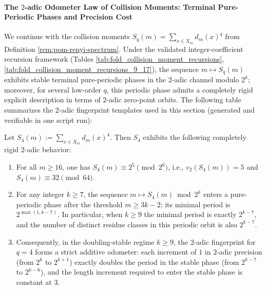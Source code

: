 
\paragraph{The \(2\)-adic Odometer Law of Collision Moments: Terminal Pure-Periodic Phases and Precision Cost}\label{subsubsec:pom-collision-moment-2adic-odometer}
We continue with the collision moments \(S_q(m)=\sum_{x\in X_m}d_m(x)^q\) from Definition \ref{rem:pom-renyi-spectrum}.
Under the validated integer-coefficient recursion framework (Tables \ref{tab:fold_collision_moment_recursions}, \ref{tab:fold_collision_moment_recursions_9_17}),
the sequence \(m\mapsto S_q(m)\) exhibits stable terminal pure-periodic phases in the \(2\)-adic channel modulo \(2^k\);
moreover, for several low-order \(q\), this periodic phase admits a completely rigid explicit description in terms of \(2\)-adic zero-point orbits.
The following table summarizes the \(2\)-adic fingerprint templates used in this section (generated and verifiable in one script run):

\begin{conclusion}[The \(2\)-adic Odometer Law for \texorpdfstring{$q=4$}{q=4}: From Constant Modulo \texorpdfstring{$2^6$}{64} to Exact Doubling Periods]\label{con:pom-s4-2adic-odometer}
Let \(S_4(m):=\sum_{x\in X_m} d_m(x)^4\).
Then \(S_4\) exhibits the following completely rigid \(2\)-adic behavior:
\begin{enumerate}
  \item For all \(m\ge 16\), one has \(S_4(m)\equiv 2^5\pmod{2^6}\), i.e., \(v_2(S_4(m))=5\) and \(S_4(m)\equiv 32\pmod{64}\).
  \item For any integer \(k\ge 7\), the sequence \(m\mapsto S_4(m)\bmod 2^k\) enters a pure-periodic phase after the threshold \(m\ge 3k-2\); its minimal period is \(2^{\max(1,k-7)}\).
  In particular, when \(k\ge 9\) the minimal period is exactly \(2^{k-7}\), and the number of distinct residue classes in this periodic orbit is also \(2^{k-7}\).
  \item Consequently, in the doubling-stable regime \(k\ge 9\), the \(2\)-adic fingerprint for \(q=4\) forms a strict additive odometer: each increment of \(1\) in \(2\)-adic precision (from \(2^k\) to \(2^{k+1}\)) exactly doubles the period in the stable phase (from \(2^{k-7}\) to \(2^{k-6}\)), and the length increment required to enter the stable phase is constant at \(3\).
\end{enumerate}
\end{conclusion}
